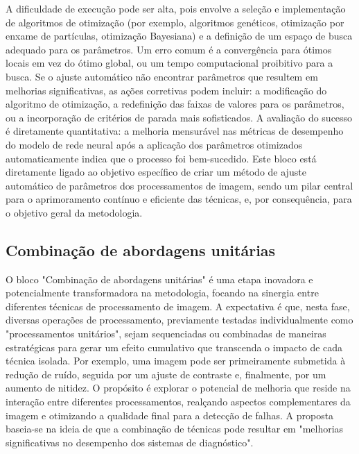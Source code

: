 A dificuldade de execução pode ser alta, pois envolve a seleção e implementação de algoritmos de otimização (por exemplo, algoritmos genéticos, otimização por enxame de partículas, otimização Bayesiana) e a definição de um espaço de busca adequado para os parâmetros. Um erro comum é a convergência para ótimos locais em vez do ótimo global, ou um tempo computacional proibitivo para a busca. Se o ajuste automático não encontrar parâmetros que resultem em melhorias significativas, as ações corretivas podem incluir: a modificação do algoritmo de otimização, a redefinição das faixas de valores para os parâmetros, ou a incorporação de critérios de parada mais sofisticados. A avaliação do sucesso é diretamente quantitativa: a melhoria mensurável nas métricas de desempenho do modelo de rede neural após a aplicação dos parâmetros otimizados automaticamente indica que o processo foi bem-sucedido. Este bloco está diretamente ligado ao objetivo específico de criar um método de ajuste automático de parâmetros dos processamentos de imagem, sendo um pilar central para o aprimoramento contínuo e eficiente das técnicas, e, por consequência, para o objetivo geral da metodologia.

\subsection{Combinação de abordagens unitárias}
O bloco "Combinação de abordagens unitárias" é uma etapa inovadora e potencialmente transformadora na metodologia, focando na sinergia entre diferentes técnicas de processamento de imagem. A expectativa é que, nesta fase, diversas operações de processamento, previamente testadas individualmente como "processamentos unitários", sejam sequenciadas ou combinadas de maneiras estratégicas para gerar um efeito cumulativo que transcenda o impacto de cada técnica isolada. Por exemplo, uma imagem pode ser primeiramente submetida à redução de ruído, seguida por um ajuste de contraste e, finalmente, por um aumento de nitidez. O propósito é explorar o potencial de melhoria que reside na interação entre diferentes processamentos, realçando aspectos complementares da imagem e otimizando a qualidade final para a detecção de falhas. A proposta baseia-se na ideia de que a combinação de técnicas pode resultar em "melhorias significativas no desempenho dos sistemas de diagnóstico".


